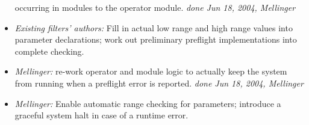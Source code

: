 \documentclass[12pt,letterpaper]{article}
\begin{document}
\begin{flushleft}
\begin{itemize}
occurring in modules to the operator module.
  \textit{done Jun 18, 2004, Mellinger}
\item \textit{Existing filters' authors:} Fill in actual low range and high range 
values into parameter declarations; work out preliminary preflight implementations 
into complete checking.
\item \textit{Mellinger:} re-work operator and module logic to actually keep the system from running when a preflight error is reported.
  \textit{done Jun 18, 2004, Mellinger}
\item \textit{Mellinger:} Enable automatic range checking for parameters; introduce a graceful system halt in case of a runtime error.
\end{itemize}
\end{flushleft}
\end{document}
